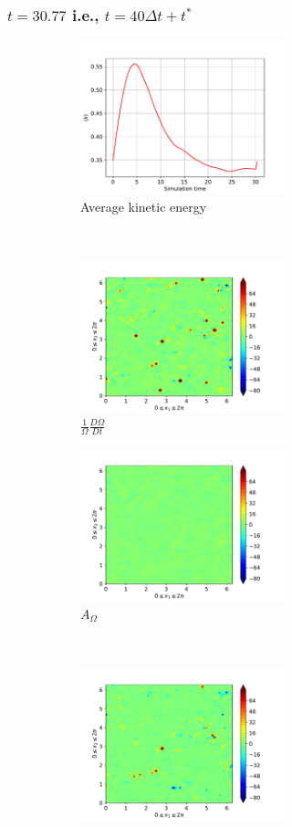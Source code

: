 \subsubsection{$t=30.77$ i.e., $t=40\Delta t + t^{\ast}$}
\begin{figure}[H]
    \begin{subfigure}[H]{0.45\textwidth}
        \includegraphics[height=1.75in]{media/run-cds-65/ke-average1360}
        \caption{Average kinetic energy}
    \end{subfigure}
    ~
    \begin{subfigure}[H]{0.45\textwidth}
        \includegraphics[height=1.75in]{media/run-cds-65/enst-1360}
        \caption{$\frac{1}{\Omega} \frac{D \Omega}{Dt}$}
    \end{subfigure}
    \newline
    \begin{subfigure}{0.45\textwidth}
        \includegraphics[height=1.75in]{media/run-cds-65/A-enst-1360}
        \caption{$A_{\Omega}$}
    \end{subfigure}
    ~
    \begin{subfigure}{0.45\textwidth}
        \includegraphics[height=1.75in]{media/run-cds-65/Pi-enst-1360}

\end{subfigure}
\end{figure}
